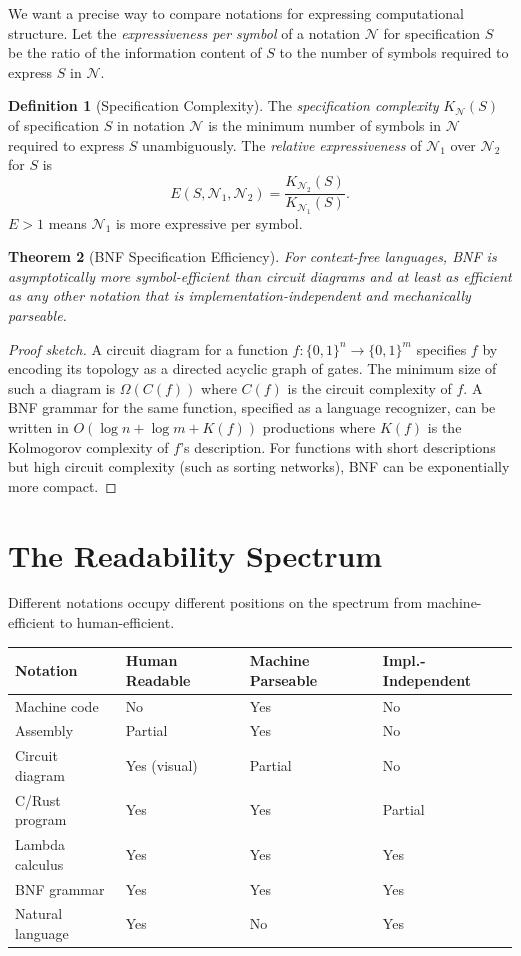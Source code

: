 \documentclass[12pt, a4paper, openany]{book}
\theoremstyle{plain}
\newtheorem{theorem}{Theorem}[chapter]
\theoremstyle{definition}
\newtheorem{definition}[theorem]{Definition}
\theoremstyle{remark}
\begin{document}
We want a precise way to compare notations for expressing computational structure.
Let the \emph{expressiveness per symbol} of a notation $\mathcal{N}$ for
specification $S$ be the ratio of the information content of $S$ to the number
of symbols required to express $S$ in $\mathcal{N}$.

\begin{definition}[Specification Complexity]
The \emph{specification complexity} $K_\mathcal{N}(S)$ of specification $S$ in
notation $\mathcal{N}$ is the minimum number of symbols in $\mathcal{N}$ required
to express $S$ unambiguously. The \emph{relative expressiveness} of $\mathcal{N}_1$
over $\mathcal{N}_2$ for $S$ is
\[
E(S, \mathcal{N}_1, \mathcal{N}_2) = \frac{K_{\mathcal{N}_2}(S)}{K_{\mathcal{N}_1}(S)}.
\]
$E > 1$ means $\mathcal{N}_1$ is more expressive per symbol.
\end{definition}

\begin{theorem}[BNF Specification Efficiency]
For context-free languages, BNF is asymptotically more symbol-efficient than
circuit diagrams and at least as efficient as any other notation that is
implementation-independent and mechanically parseable.
\end{theorem}

\begin{proof}[Proof sketch]
A circuit diagram for a function $f : \{0,1\}^n \to \{0,1\}^m$ specifies $f$
by encoding its topology as a directed acyclic graph of gates. The minimum size
of such a diagram is $\Omega(C(f))$ where $C(f)$ is the circuit complexity of
$f$. A BNF grammar for the same function, specified as a language recognizer,
can be written in $O(\log n + \log m + K(f))$ productions where $K(f)$ is the
Kolmogorov complexity of $f$'s description. For functions with short
descriptions but high circuit complexity (such as sorting networks), BNF can be
exponentially more compact.
\end{proof}

\section{The Readability Spectrum}

Different notations occupy different positions on the spectrum from machine-efficient
to human-efficient.

\begin{center}
\begin{tabular}{llll}
\toprule
Notation & Human Readable & Machine Parseable & Impl.-Independent \\
\midrule
Machine code & No & Yes & No \\
Assembly & Partial & Yes & No \\
Circuit diagram & Yes (visual) & Partial & No \\
C/Rust program & Yes & Yes & Partial \\
Lambda calculus & Yes & Yes & Yes \\
BNF grammar & Yes & Yes & Yes \\
Natural language & Yes & No & Yes \\
\bottomrule
\end{tabular}
\end{center}
\end{document}
